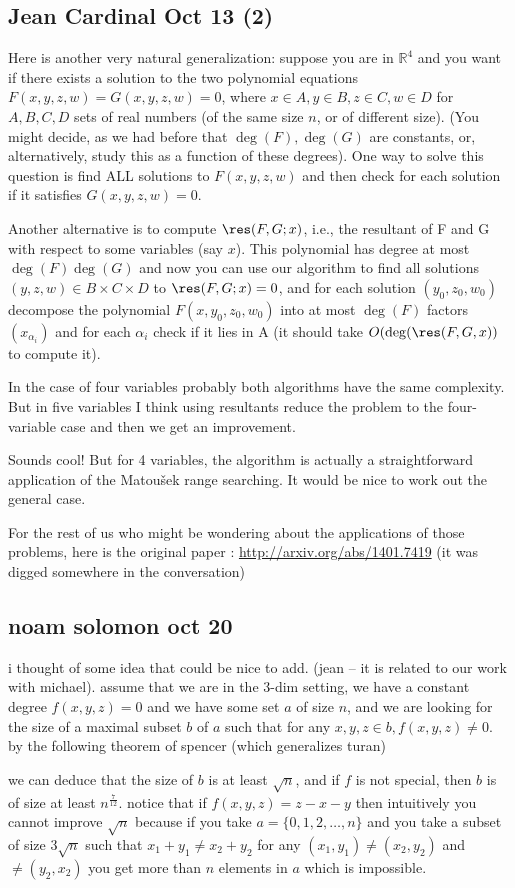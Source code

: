 \subsection{Jean Cardinal Oct 13 (2)}
\begin{displayquote}
	Here is another very natural generalization: suppose you are in $\mathbb{R}^4$
and you want if there exists a solution to the two polynomial equations
$F(x,y,z,w)=G(x,y,z,w)=0$, where $x \in A, y\in B, z\in C, w \in D$ for $A,B,C,D$
sets of real numbers (of the same size $n$, or of different size).
(You might decide, as we had before that $\deg(F), \deg(G)$ are constants,
or, alternatively, study this as a function of these degrees).
One way to solve this question is find ALL solutions to $F(x,y,z,w)$ and then
check for each solution if it satisfies $G(x,y,z,w)=0$.

Another alternative is to compute $\res(F,G; x)$, i.e., the resultant of F and
G with respect to some variables (say $x$). This polynomial has degree at
most $\deg(F)\deg(G)$ and now you can use our algorithm to find all solutions
$(y,z,w) \in B\times C \times D$ to $\res(F,G;x)=0$, and for each solution $(y_0,
z_0, w_0)$ decompose the polynomial $F(x,y_0,z_0,w_0)$ into at most $\deg(F)$
factors $(x_{\alpha_i})$ and for each $\alpha_i$  check if it lies in A (it
should take $O(\deg(\res(F,G,x))$ to compute it).

In the case of four variables probably both algorithms have the same
complexity. But in five variables I think using resultants reduce the
problem to the four-variable case and then we get an improvement.
\end{displayquote}

Sounds cool!
But for 4 variables, the algorithm is actually a straightforward
application of the Matou\v{s}ek range searching.
It would be nice to work out the general case.

For the rest of us who might be wondering about the applications of those
problems, here is the original paper :
\url{http://arxiv.org/abs/1401.7419}
(it was digged somewhere in the conversation)

\subsection{noam solomon oct 20}
i thought of some idea that could be nice to add. (jean -- it is related to
our work with michael).
assume that we are in the 3-dim setting, we have a constant degree
$f(x,y,z)=0$ and we have some set $a$ of size $n$, and we are looking for the
size of a maximal subset $b$ of $a$ such that for any $x,y,z \in b, f(x,y,z) \ne
0$.
by the following theorem of spencer (which generalizes turan)

we can deduce that the size of $b$ is at least $\sqrt n$, and if $f$ is not
special, then $b$ is of size at least $n^{\frac{7}{12}}$. notice that if
$f(x,y,z)=z-x-y$ then intuitively you cannot improve $\sqrt n$ because if you
take $a=\{0,1,2,\ldots,n\}$ and you take a subset of size $3\sqrt n$ such that
$x_1+y_1 \ne x_2+y_2$ for any $(x_1,y_1) \ne (x_2,y_2)$ and $\ne (y_2,x_2)$
you get more than $n$ elements in $a$ which is impossible.

